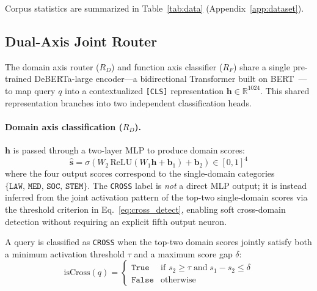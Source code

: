 \documentclass[a4paper,fleql]{cas-sc}
\begin{document}
Corpus statistics are summarized in Table~\ref{tab:data} (Appendix~\ref{app:dataset}).

\subsection{Dual-Axis Joint Router}
\label{ssec:domainrouter}
The domain axis router ($R_D$) and function axis classifier ($R_F$) share
a single pre-trained DeBERTa-large encoder---a bidirectional Transformer
built on BERT~\citep{devlin2019bert}---to map query $q$ into a contextualized
\texttt{[CLS]} representation $\mathbf{h} \in \mathbb{R}^{1024}$. This
shared representation branches into two independent classification heads.

\paragraph{Domain axis classification ($R_D$).}
$\mathbf{h}$ is passed through a two-layer MLP to produce domain scores:
\begin{equation}
    \hat{\mathbf{s}} = \sigma \left( W_2\, \text{ReLU}
    (W_1 \mathbf{h} + \mathbf{b}_1) + \mathbf{b}_2 \right) \in [0,1]^4
    \label{eq:router}
\end{equation}
where the four output scores correspond to the single-domain categories
$\{\texttt{LAW},\, \texttt{MED},\, \texttt{SOC},\, \texttt{STEM}\}$.
The \texttt{CROSS} label is \emph{not} a direct MLP output; it is instead
inferred from the joint activation pattern of the top-two single-domain
scores via the threshold criterion in Eq.~\ref{eq:cross_detect}, enabling
soft cross-domain detection without requiring an explicit fifth output neuron.

A query is classified as \texttt{CROSS} when the top-two domain scores
jointly satisfy both a minimum activation threshold $\tau$ and a maximum
score gap $\delta$:
\begin{equation}
    \text{isCross}(q) =
    \begin{cases}
        \texttt{True}  & \text{if } s_2 \geq \tau \;\text{and}\;
                         s_1 - s_2 \leq \delta \\
        \texttt{False} & \text{otherwise}
    \end{cases}
    \label{eq:cross_detect}
\end{equation}
\end{document}
